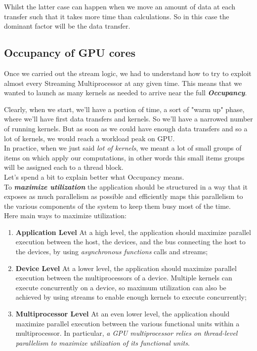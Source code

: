 	
	Whilst the latter case can happen when we move an amount of data at each transfer such that it takes more time than calculations. So in this case the dominant factor will be the data transfer.	

	
	\subsection{Occupancy of GPU cores}
	Once we carried out the stream logic, we had to understand how to try to exploit almost every Streaming Multiprocessor at any given time.
	This means that we wanted to launch as many kernels as needed to arrive near the full \textit{\textbf{Occupancy}}.
	
	Clearly, when we start, we'll have a portion of time, a sort of "warm up" phase, where we'll have first data transfers and kernels. So we'll have a narrowed number of running kernels. 
	But as soon as we could have enough data transfers and so a lot of kernels, we would reach a workload peak on GPU.\\
	In practice, when we just said \textit{lot of kernels}, we meant a lot of small groups of items on which apply our computations, in other words this small items groups will be assigned each to a thread block.\\ Let's spend a bit to explain better what Occupancy means.\\

	To \textit{\textbf{maximize utilization}} the application should be structured in a way that it exposes
	as much parallelism as possible and efficiently maps this parallelism to the various	components of the system to keep them busy most of the time.\\
	Here main ways to maximize utilization:
	\begin{enumerate}
			\item \textbf{Application Level}
			At a high level, the application should maximize parallel execution between the host, the
			devices, and the bus connecting the host to the devices, by using \textit{asynchronous functions} calls and streams;
			
			
			\item \textbf{Device Level}
			At a lower level, the application should maximize parallel execution between the multiprocessors of a device.
			Multiple kernels can execute concurrently on a device, so maximum utilization can also be achieved by using streams to enable enough kernels to execute concurrently;
			
			
			\item \textbf{Multiprocessor Level}
			At an even lower level, the application should maximize parallel execution between the	various functional units within a multiprocessor.
			In particular, \textit{a GPU multiprocessor relies on thread-level parallelism to maximize utilization of its functional units}. 
	\end{enumerate}
	
